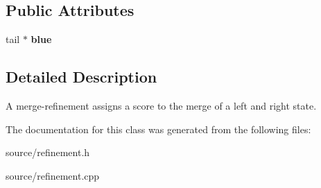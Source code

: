 \subsection*{Public Attributes}
\begin{DoxyCompactItemize}
\item 
\mbox{\label{classmerge__refinement_af413c36fd61642d4c6ace0bec57192f4}} 
tail $\ast$ {\bfseries blue}
\end{DoxyCompactItemize}


\subsection{Detailed Description}
A merge-\/refinement assigns a score to the merge of a left and right state. 

The documentation for this class was generated from the following files\+:\begin{DoxyCompactItemize}
\item 
source/refinement.\+h\item 
source/refinement.\+cpp\end{DoxyCompactItemize}
